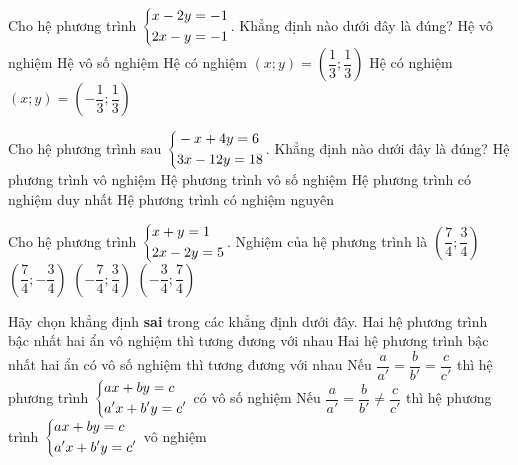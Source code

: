 \begin{bt}
	Cho hệ phương trình $\left\{\begin{aligned}&x-2y=-1\\&2x-y=-1\end{aligned}\right.$. Khẳng định nào dưới đây là đúng?
	\choice
	{Hệ vô nghiệm}
	{Hệ vô số nghiệm}
	{Hệ có nghiệm $(x;y)=\left(\dfrac{1}{3};\dfrac{1}{3}\right)$}
	{\True Hệ có nghiệm $(x;y)=\left(-\dfrac{1}{3}; \dfrac{1}{3}\right)$}
\end{bt}

\begin{bt}
	Cho hệ phương trình sau $\left\{\begin{aligned}&-x+4y=6\\&3x-12y=18\end{aligned}\right.$. Khẳng định nào dưới đây là đúng?
	\choice
	{\True Hệ phương trình vô nghiệm}
	{Hệ phương trình vô số nghiệm}
	{Hệ phương trình có nghiệm duy nhất}
	{Hệ phương trình có nghiệm nguyên}
\end{bt}

\begin{bt}
	Cho hệ phương trình $\left\{\begin{aligned}&x+y=1\\&2x-2y=5\end{aligned}\right.$. Nghiệm của hệ phương trình là
	\choice
	{$\left(\dfrac{7}{4};\dfrac{3}{4}\right)$}
	{\True $\left(\dfrac{7}{4};-\dfrac{3}{4}\right)$}
	{$\left(-\dfrac{7}{4};\dfrac{3}{4}\right)$}
	{$(-\dfrac{3}{4};\dfrac{7}{4})$}
\end{bt}

\begin{bt}
	Hãy chọn khẳng định \textbf{sai} trong các khẳng định dưới đây.
	\choice
	{Hai hệ phương trình bậc nhất hai ẩn vô nghiệm thì tương đương với nhau}
	{\True Hai hệ phương trình bậc nhất hai ẩn có vô số nghiệm thì tương đương với nhau}
	{Nếu $\dfrac{a}{a'}=\dfrac{b}{b'}=\dfrac{c}{c'}$ thì hệ phương trình $\left\{\begin{aligned}&ax+by=c\\&a'x+b'y=c'\end{aligned}\right.$ có vô số nghiệm}
	{Nếu $\dfrac{a}{a'}=\dfrac{b}{b'}\ne\dfrac{c}{c'}$ thì hệ phương trình $\left\{\begin{aligned}&ax+by=c\\&a'x+b'y=c'\end{aligned}\right.$ vô nghiệm}
\end{bt}

